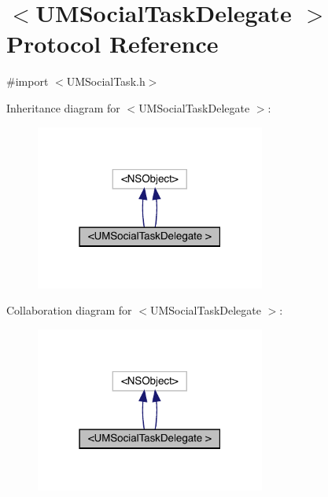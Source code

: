 \hypertarget{protocol_u_m_social_task_delegate_01-p}{}\section{$<$U\+M\+Social\+Task\+Delegate $>$ Protocol Reference}
\label{protocol_u_m_social_task_delegate_01-p}


{\ttfamily \#import $<$U\+M\+Social\+Task.\+h$>$}



Inheritance diagram for $<$U\+M\+Social\+Task\+Delegate $>$\+:\nopagebreak
\begin{figure}[H]
\begin{center}
\leavevmode
\includegraphics[width=214pt]{protocol_u_m_social_task_delegate_01-p__inherit__graph}
\end{center}
\end{figure}


Collaboration diagram for $<$U\+M\+Social\+Task\+Delegate $>$\+:\nopagebreak
\begin{figure}[H]
\begin{center}
\leavevmode
\includegraphics[width=214pt]{protocol_u_m_social_task_delegate_01-p__coll__graph}
\end{center}
\end{figure}
